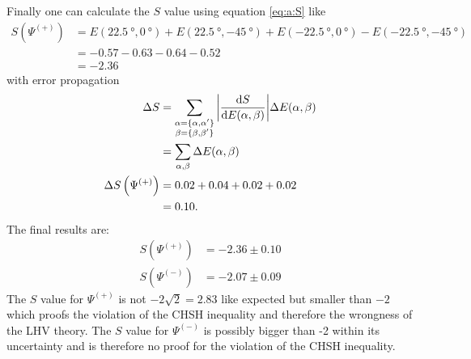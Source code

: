 Finally one can calculate the $S$ value using equation \eqref{eq:a:S} like
\begin{align*}
S\left(\Psi^{(+)}\right)
    &= E\left(\SI{22.5}{\degree},\SI{0}{\degree}\right)
    + E\left(\SI{22.5}{\degree},\SI{-45}{\degree}\right)
    + E\left(\SI{-22.5}{\degree},\SI{0}{\degree}\right)
    - E\left(\SI{-22.5}{\degree},\SI{-45}{\degree}\right)
    \\
    &=-0.57-0.63-0.64-0.52
    \\
    &=-2.36
\end{align*}
with error propagation
\begin{subequations}
\label{eq:a:dS}
\begin{align}
\Delta S
    &= \sum_{\substack{\alpha=\lbrace\alpha,\alpha'\rbrace\\\beta=\lbrace\beta,\beta'\rbrace}}\abs{\frac{\dd S}{\dd E(\alpha,\beta)}}\Delta E(\alpha,\beta)
    \label{eq:a:dS:1}\\
    &=\sum_{\alpha,\beta}\Delta E(\alpha,\beta)
    \label{eq:a:dS:2}\\
\Delta S\left(\Psi^{(+)}\right)
    &=0.02+0.04+0.02+0.02
    \nonumber\\
    &=0.10.
    \nonumber
\end{align}
\end{subequations}
The final results are:
\begin{align*}
S\left(\Psi^{(+)}\right)
    &=-2.36\pm 0.10
    \\
S\left(\Psi^{(-)}\right)
    &=-2.07\pm 0.09
\end{align*}
The $S$ value for $\Psi^{(+)}$ is not $-2\sqrt{2}=2.83$ like expected but smaller than $-2$ which proofs the violation of the CHSH inequality and therefore the wrongness of the LHV theory.
The $S$ value for $\Psi^{(-)}$ is possibly bigger than -2 within its uncertainty and is therefore no proof for the violation of the CHSH inequality.

